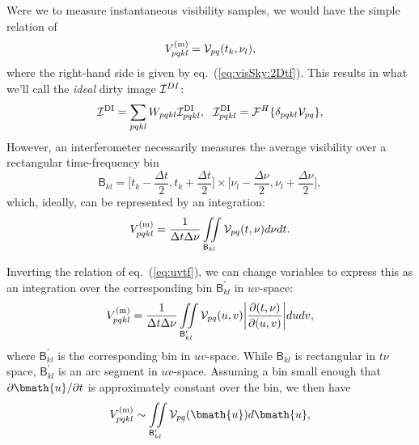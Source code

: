 \documentclass[useAMS,usenatbib]{mn2e}
\begin{document}
Were we to measure instantaneous visibility samples, we would have the simple relation of
\begin{equation}
V^\mathrm{(m)}_{pqkl}  = \mathcal{V}_{pq}(t_k,\nu_l),
\end{equation}
where the right-hand side is given by eq.~(\ref{eq:visSky:2Dtf}). This results in what we'll call the \emph{ideal} dirty image 
$\mathcal{I}^{DI}$:
\begin{equation}
\label{eq:imaging:DI}
\mathcal{I}^\mathrm{DI} =  \sum_{pqkl} W_{pqkl} \mathcal{I}^\mathrm{DI}_{pqkl},~~
\mathcal{I}^\mathrm{DI}_{pqkl} =  \mathcal{F}^H\{ \delta_{pqkl}\mathcal{V}_{pq} \},
\end{equation}
However, an interferometer necessarily measures the
average visibility over a rectangular time-frequency bin 
\begin{equation}
\mathsf{B}_{kl} = \bigg [ t_k-\frac{\Delta t}{2},t_k+\frac{\Delta t}{2} \bigg ]
\times
\bigg [ \nu_l-\frac{\Delta\nu}{2},\nu_l+\frac{\Delta\nu}{2} \bigg ],  
\end{equation}
which, ideally, can be represented by an integration:
\begin{equation}
V^\mathrm{(m)}_{pqkl} = \frac{1}{\Delta t \Delta \nu} 
\iint\limits_{\mathsf{B}_{kl}}
\mathcal{V}_{pq}(t,\nu)d\nu dt.
\label{eq2:conti}
\end{equation}

Inverting the relation of eq.~(\ref{eq:uvtf}), we can change variables to express this as an integration over the 
corresponding bin $\mathsf{B}^{\prime}_{kl}$ in $uv$-space:
\begin{equation}
V^\mathrm{(m)}_{pqkl} = \frac{1}{\Delta t \Delta \nu} 
\iint\limits_{\mathsf{B}^{\prime}_{kl}}
\mathcal{V}_{pq}(u,v)\bigg| \frac{\partial(t,\nu)}{\partial(u,v)}\bigg| dudv,
\label{eq2:conti:uv}
\end{equation}
where $\mathsf{B}^{\prime}_{kl}$ is the corresponding bin in $uv$-space. While $\mathsf{B}_{kl}$ is rectangular in $t\nu$ space, 
$\mathsf{B}^{\prime}_{kl}$ is an arc segment in $uv$-space. Assuming a bin small enough that 
$\partial\bmath{u}/\partial t$ is approximately constant over the bin, we then have
\begin{equation}
V^\mathrm{(m)}_{pqkl} \sim \iint\limits_{\mathsf{B}^{\prime}_{kl}}
\VV_{pq}(\bmath{u}) d\bmath{u},
\label{eq2:conti:uv1}
\end{equation}

\end{document}
